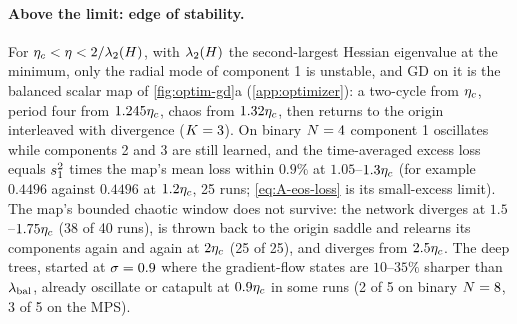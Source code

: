 \paragraph{Above the limit: edge of stability.}
\derived{} \empirical{} For $\eta_c<\eta<2/\lambda_2(H)$, with $\lambda_2(H)$ the second-largest Hessian eigenvalue at
the minimum, only the radial mode of component 1 is unstable, and GD on
it is the balanced scalar map of \cref{fig:optim-gd}a (\cref{app:optimizer}): a two-cycle from $\eta_c$, period four
from $1.245\eta_c$, chaos from $1.32\eta_c$, then returns to the origin interleaved with divergence ($K=3$). On binary
$N=4$ component 1 oscillates while components 2 and 3 are still learned, and the time-averaged excess loss equals
$s_{1}^2$ times the map's mean loss within $0.9\%$ at $1.05$--$1.3\eta_c$ (for example $0.4496$ against $0.4496$ at
$1.2\eta_c$, 25 runs; \eqref{eq:A-eos-loss} is its small-excess limit). The map's bounded chaotic window does not
survive: the network diverges at $1.5$--$1.75\eta_c$ (38 of 40 runs), is thrown back to the origin saddle and relearns
its components again and again at $2\eta_c$ (25 of 25), and diverges from $2.5\eta_c$. The deep trees, started at
$\sigma=0.9$ where the gradient-flow states are $10$--$35\%$ sharper than $\lambda_{\rm bal}$, already oscillate or
catapult at $0.9\eta_c$ in some runs (2 of 5 on binary $N=8$, 3 of 5 on the MPS).

